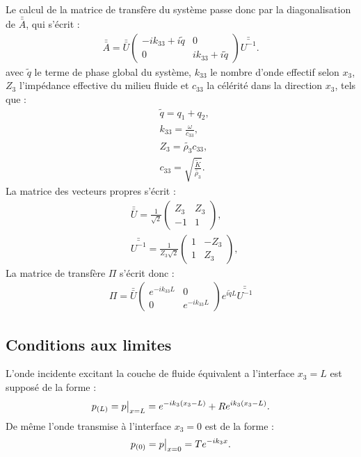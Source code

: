 \documentclass[twoside,openright]{report}
\begin{document}
    Le calcul de la matrice de transfère du système passe donc par la diagonalisation de $\bar{\bar{A}}$, qui s'écrit :
    \begin{align}
    \bar{\bar{A}}=\bar{\bar{U}} \begin{pmatrix}
    								-ik_{33}+i\tilde{q} & 0 \\ 0 & ik_{33}+i\tilde{q} 
    							\end{pmatrix} \bar{\bar{U^{-1}}}.
    \end{align}
    avec $\tilde{q}$ le terme de phase global du système, $k_{33}$ le nombre d'onde effectif selon $x_3$, $Z_3$ l'impédance effective du milieu fluide et $c_{33}$ la célérité dans la direction $x_3$, tels que :
    \begin{align}
        &\tilde{q}=q_1+q_2,\label{def:qtild}\\
        &k_{33}=\frac{\omega}{c_{33}},\label{def:k33}\\
        &Z_3=\tilde{\rho_3}c_{33},\label{def:Z3}\\
        &c_{33}=\sqrt{\frac{\tilde{K}}{\tilde{\rho_3}}}.\label{def:c33}
    \end{align}
    La matrice des vecteurs propres s'écrit :
    \begin{align}
    &\bar{\bar{U}}=\frac{1}{\sqrt{2}}\begin{pmatrix}
    					Z_3 & Z_3 \\ -1 & 1
    								\end{pmatrix},\\
    &\bar{\bar{U^{-1}}}=\frac{1}{Z_3 \sqrt{2}}\begin{pmatrix}
    					1 & -Z_3 \\ 1 & Z_3
    		   						\end{pmatrix},           
    \end{align}
    La matrice de transfère $\Pi$ s'écrit donc :
        \begin{align}
    \Pi=\bar{\bar{U}}\begin{pmatrix}
    e^{-ik_{33}L} & 0 \\ 0 & e^{-ik_{33}L} 
    \end{pmatrix} e^{i\tilde{q}L}\bar{\bar{U^{-1}}}\label{Matrice_Transfere}
    \end{align}

\subsection{Conditions aux limites}
\label{Ch_Prop_S_Pb_SS_BC}
    L'onde incidente excitant la couche de fluide équivalent a l'interface $x_3=L$ est supposé de la forme :
    \begin{align}
    p_{(L)}=p\big{|}_{x=L}=e^{-i k_3(x_3-L)}+R e^{i k_3(x_3-L)}.
    \end{align}
    De même l'onde transmise à l'interface $x_3=0$ est de la forme : 
    \begin{align}
    p_{(0)}=p\big{|}_{x=0}=Te^{-ik_3x}.
    \end{align}
\end{document}
